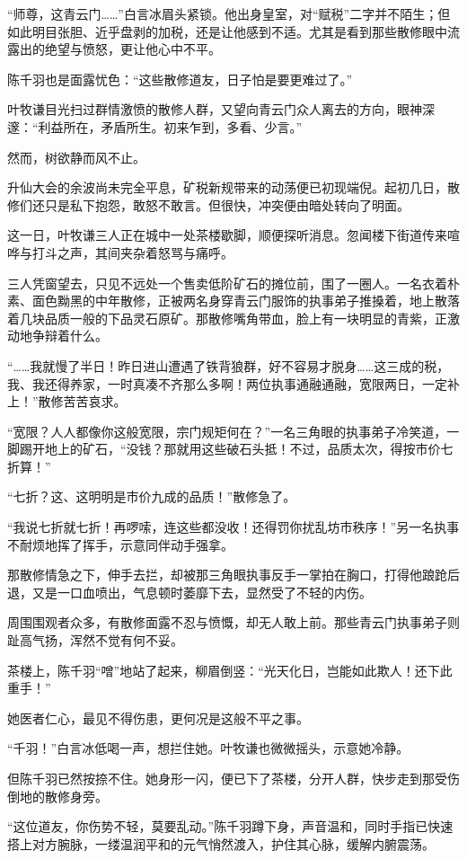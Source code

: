 “师尊，这青云门……”白言冰眉头紧锁。他出身皇室，对“赋税”二字并不陌生；但如此明目张胆、近乎盘剥的加税，还是让他感到不适。尤其是看到那些散修眼中流露出的绝望与愤怒，更让他心中不平。

陈千羽也是面露忧色：“这些散修道友，日子怕是要更难过了。”

叶牧谦目光扫过群情激愤的散修人群，又望向青云门众人离去的方向，眼神深邃：“利益所在，矛盾所生。初来乍到，多看、少言。”

然而，树欲静而风不止。

升仙大会的余波尚未完全平息，矿税新规带来的动荡便已初现端倪。起初几日，散修们还只是私下抱怨，敢怒不敢言。但很快，冲突便由暗处转向了明面。

这一日，叶牧谦三人正在城中一处茶楼歇脚，顺便探听消息。忽闻楼下街道传来喧哗与打斗之声，其间夹杂着怒骂与痛呼。

三人凭窗望去，只见不远处一个售卖低阶矿石的摊位前，围了一圈人。一名衣着朴素、面色黝黑的中年散修，正被两名身穿青云门服饰的执事弟子推搡着，地上散落着几块品质一般的下品灵石原矿。那散修嘴角带血，脸上有一块明显的青紫，正激动地争辩着什么。

“……我就慢了半日！昨日进山遭遇了铁背狼群，好不容易才脱身……这三成的税，我、我还得养家，一时真凑不齐那么多啊！两位执事通融通融，宽限两日，一定补上！”散修苦苦哀求。

“宽限？人人都像你这般宽限，宗门规矩何在？”一名三角眼的执事弟子冷笑道，一脚踢开地上的矿石，“没钱？那就用这些破石头抵！不过，品质太次，得按市价七折算！”

“七折？这、这明明是市价九成的品质！”散修急了。

“我说七折就七折！再啰嗦，连这些都没收！还得罚你扰乱坊市秩序！”另一名执事不耐烦地挥了挥手，示意同伴动手强拿。

那散修情急之下，伸手去拦，却被那三角眼执事反手一掌拍在胸口，打得他踉跄后退，又是一口血喷出，气息顿时萎靡下去，显然受了不轻的内伤。

周围围观者众多，有散修面露不忍与愤慨，却无人敢上前。那些青云门执事弟子则趾高气扬，浑然不觉有何不妥。

茶楼上，陈千羽“噌”地站了起来，柳眉倒竖：“光天化日，岂能如此欺人！还下此重手！”

她医者仁心，最见不得伤患，更何况是这般不平之事。

“千羽！”白言冰低喝一声，想拦住她。叶牧谦也微微摇头，示意她冷静。

但陈千羽已然按捺不住。她身形一闪，便已下了茶楼，分开人群，快步走到那受伤倒地的散修身旁。

“这位道友，你伤势不轻，莫要乱动。”陈千羽蹲下身，声音温和，同时手指已快速搭上对方腕脉，一缕温润平和的元气悄然渡入，护住其心脉，缓解内腑震荡。


